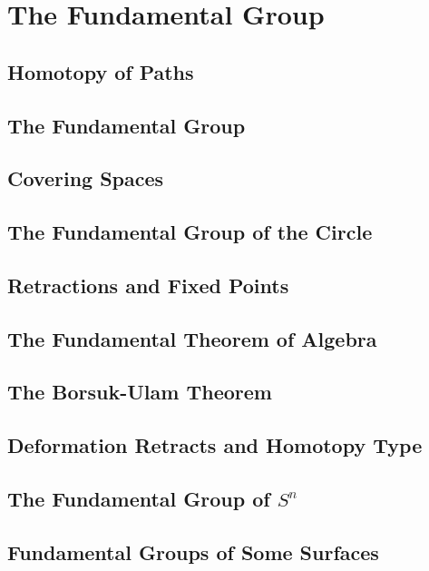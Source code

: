 \chapter{The Fundamental Group}

\section{Homotopy of Paths}

\section{The Fundamental Group}

\section{Covering Spaces}

\section{The Fundamental Group of the Circle}

\section{Retractions and Fixed Points}

\section{The Fundamental Theorem of Algebra}

\section{The Borsuk-Ulam Theorem}

\section{Deformation Retracts and Homotopy Type}

\section{The Fundamental Group of $S^{n}$}

\section{Fundamental Groups of Some Surfaces}
